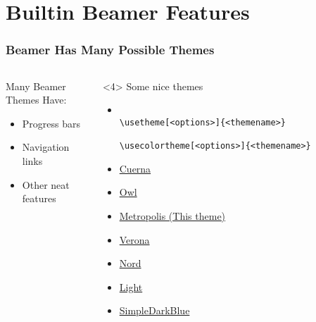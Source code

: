 \documentclass{beamer}
\begin{document}
    \section{Builtin Beamer Features}
        \begin{frame}[fragile]
            \frametitle{Beamer Has Many Possible Themes}
            \begin{columns}[T]
                \begin{column}{0.3\textwidth}
                    Many Beamer Themes Have:
                    \begin{itemize}
                        \item<1-> Progress bars
                        \item<2-> Navigation links
                        \item<3-> Other neat features
                    \end{itemize}
                \end{column}
                \begin{column}{0.7\textwidth}
                        \begin{visibleenv}<4>
                        Some nice themes
                        \end{visibleenv}
                        \begin{itemize}
                            \item<4->
                                \begin{verbatim}
                                    \usetheme[<options>]{<themename>}
                                    \usecolortheme[<options>]{<themename>}
                                \end{verbatim}
                            \item<4-> \href{https://ctan.org/pkg/beamertheme-cuerna}{Cuerna}
                            \item<4-> \href{https://ctan.org/pkg/beamercolorthemeowl}{Owl}
                            \item<4-> \href{https://ctan.org/pkg/beamertheme-metropolis}{Metropolis (This theme)}
                            \item<4-> \href{https://ctan.org/pkg/beamer-verona}{Verona}
                            \item<4-> \href{https://ctan.org/pkg/beamerthemenord}{Nord}
                            \item<4-> \href{https://ctan.org/pkg/beamertheme-light}{Light}
                            \item<4-> \href{https://ctan.org/pkg/beamertheme-simpledarkblue}{SimpleDarkBlue}
                        \end{itemize}
                \end{column}
            \end{columns}
        \end{frame}
\end{document}
